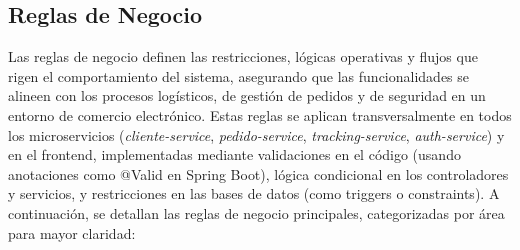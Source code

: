 \documentclass[a4paper,12pt]{article}
\begin{document}
\subsection{Reglas de Negocio}
Las reglas de negocio definen las restricciones, lógicas operativas y flujos que rigen el comportamiento del sistema, asegurando que las funcionalidades se alineen con los procesos logísticos, de gestión de pedidos y de seguridad en un entorno de comercio electrónico. Estas reglas se aplican transversalmente en todos los microservicios (\textit{cliente-service}, \textit{pedido-service}, \textit{tracking-service}, \textit{auth-service}) y en el frontend, implementadas mediante validaciones en el código (usando anotaciones como @Valid en Spring Boot), lógica condicional en los controladores y servicios, y restricciones en las bases de datos (como triggers o constraints). A continuación, se detallan las reglas de negocio principales, categorizadas por área para mayor claridad:
\end{document}
